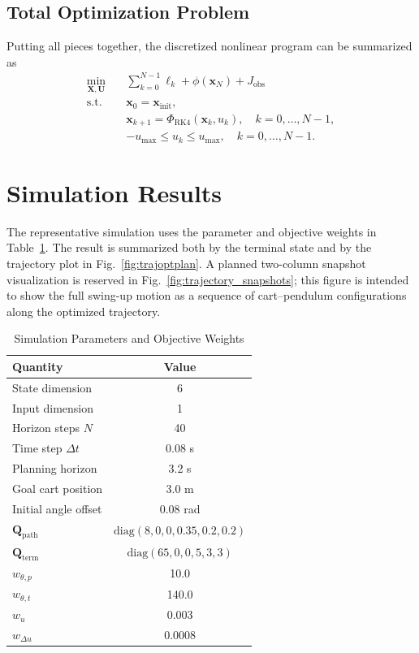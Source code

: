 \documentclass[conference]{IEEEtran}
\begin{document}
\subsection{Total Optimization Problem}
Putting all pieces together, the discretized nonlinear program can be summarized as
\begin{align}
\min_{\bm{X},\bm{U}} \quad &
\sum_{k=0}^{N-1} \ell_k + \phi(\bm{x}_N) + J_{\mathrm{obs}} \\
\text{s.t.} \quad &
\bm{x}_0 = \bm{x}_{\mathrm{init}}, \\
& \bm{x}_{k+1} = \Phi_{\mathrm{RK4}}(\bm{x}_k,u_k), \quad k=0,\ldots,N-1, \\
& -u_{\max} \le u_k \le u_{\max}, \quad k=0,\ldots,N-1.
\end{align}
\section{Simulation Results}
The representative simulation uses the parameter and objective weights in Table~\ref{tab:trajparams}. The result is summarized both by the terminal state and by the trajectory plot in Fig.~\ref{fig:trajoptplan}. A planned two-column snapshot visualization is reserved in Fig.~\ref{fig:trajectory_snapshots}; this figure is intended to show the full swing-up motion as a sequence of cart--pendulum configurations along the optimized trajectory.

\begin{table}[t]
\caption{Simulation Parameters and Objective Weights}
\label{tab:trajparams}
\centering
\begin{tabular}{l c}
\toprule
Quantity & Value \\
\midrule
State dimension & 6 \\
Input dimension & 1 \\
Horizon steps $N$ & 40 \\
Time step $\Delta t$ & 0.08 s \\
Planning horizon & 3.2 s \\
Goal cart position & 3.0 m \\
Initial angle offset & 0.08 rad \\
$\bm{Q}_{\mathrm{path}}$ & $\mathrm{diag}(8,0,0,0.35,0.2,0.2)$ \\
$\bm{Q}_{\mathrm{term}}$ & $\mathrm{diag}(65,0,0,5,3,3)$ \\
$w_{\theta,p}$ & 10.0 \\
$w_{\theta,t}$ & 140.0 \\
$w_u$ & 0.003 \\
$w_{\Delta u}$ & 0.0008 \\
\bottomrule
\end{tabular}
\end{table}
\end{document}
